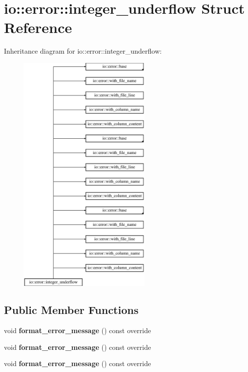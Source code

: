 \hypertarget{structio_1_1error_1_1integer__underflow}{}\section{io\+:\+:error\+:\+:integer\+\_\+underflow Struct Reference}
\label{structio_1_1error_1_1integer__underflow}
Inheritance diagram for io\+:\+:error\+:\+:integer\+\_\+underflow\+:\begin{figure}[H]
\begin{center}
\leavevmode
\includegraphics[height=12.000000cm]{d8/d9f/structio_1_1error_1_1integer__underflow}
\end{center}
\end{figure}
\subsection*{Public Member Functions}
\begin{DoxyCompactItemize}
\item 
\mbox{\label{structio_1_1error_1_1integer__underflow_a007866fe0a8e8111cac2d06ff37b6400}} 
void {\bfseries format\+\_\+error\+\_\+message} () const override
\item 
\mbox{\label{structio_1_1error_1_1integer__underflow_a007866fe0a8e8111cac2d06ff37b6400}} 
void {\bfseries format\+\_\+error\+\_\+message} () const override
\item 
\mbox{\label{structio_1_1error_1_1integer__underflow_a007866fe0a8e8111cac2d06ff37b6400}} 
void {\bfseries format\+\_\+error\+\_\+message} () const override
\end{DoxyCompactItemize}

